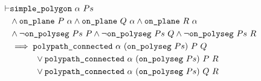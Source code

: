 \begin{align*}
\vdash &\code{simple\_polygon}\ \alpha\ Ps\\
       &\wedge \code{on\_plane}\ P\ \alpha \wedge \code{on\_plane}\ Q\ \alpha \wedge \code{on\_plane}\ R\ \alpha\\
       &\wedge \neg\code{on\_polyseg}\ Ps\ P\wedge \neg\code{on\_polyseg}\ Ps\ Q\wedge \neg\code{on\_polyseg}\ Ps\ R\\
       &\implies \code{polypath\_connected}\ \alpha\ (\code{on\_polyseg}\ Ps)\ P\ Q\\
       &\qquad\quad\vee \code{polypath\_connected}\ \alpha\ (\code{on\_polyseg}\ Ps)\ P\ R\\
       &\qquad\quad\vee \code{polypath\_connected}\ \alpha\ (\code{on\_polyseg}\ Ps)\ Q\ R
\end{align*}

